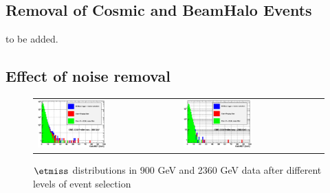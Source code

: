 \subsection{Removal of Cosmic and BeamHalo Events}
to be added.

\subsection{Effect of noise removal}
\begin{figure}[h!]
 \centering
 \begin{tabular}{ll}
  \includegraphics[width=0.5\textwidth]{plots_EventSelection/calometPt_afterFilters_900.eps} &
  \includegraphics[width=0.5\textwidth]{plots_EventSelection/calometPt_afterFilters_2360.eps} \\
 \end{tabular}
 \caption{$\etmiss$ distributions in 900 GeV and 2360 GeV data after different levels of event selection ~\label{fig:calometAfterCuts}}
\end{figure}

\clearpage
